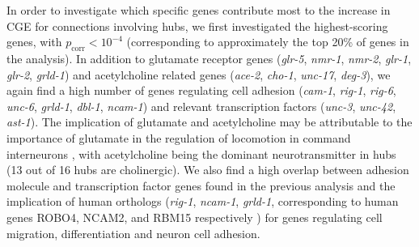 \documentclass[10pt,letterpaper]{article}
\begin{document}
{%
In order to investigate which specific genes contribute most to the increase in CGE for connections involving hubs, we first investigated the highest-scoring genes, with $p_\mathrm{corr} < 10^{-4}$ (corresponding to approximately the top 20\% of genes in the analysis).
In addition to glutamate receptor genes (\emph{glr-5}, \emph{nmr-1}, \emph{nmr-2}, \emph{glr-1}, \emph{glr-2}, \emph{grld-1})
and acetylcholine related genes (\emph{ace-2}, \emph{cho-1}, \emph{unc-17}, \emph{deg-3}),
we again find a high number of genes regulating cell adhesion (\emph{cam-1}, \emph{rig-1}, \emph{rig-6}, \emph{unc-6}, \emph{grld-1}, \emph{dbl-1}, \emph{ncam-1})
and relevant transcription factors (\emph{unc-3}, \emph{unc-42}, \emph{ast-1}).
The implication of glutamate and acetylcholine may be attributable to the importance of glutamate in the regulation of locomotion in command interneurons \cite{Choi2015, Zheng1999}, with acetylcholine being the dominant neurotransmitter in hubs (13 out of 16 hubs are cholinergic).
We also find a high overlap between adhesion molecule and transcription factor genes found in the previous analysis and the implication of human orthologs (\emph{rig-1}, \emph{ncam-1}, \emph{grld-1}, corresponding to human genes ROBO4, NCAM2, and RBM15 respectively  \cite{Harris:2009kd}) for genes regulating cell migration, differentiation and neuron cell adhesion.


}
\end{document}
